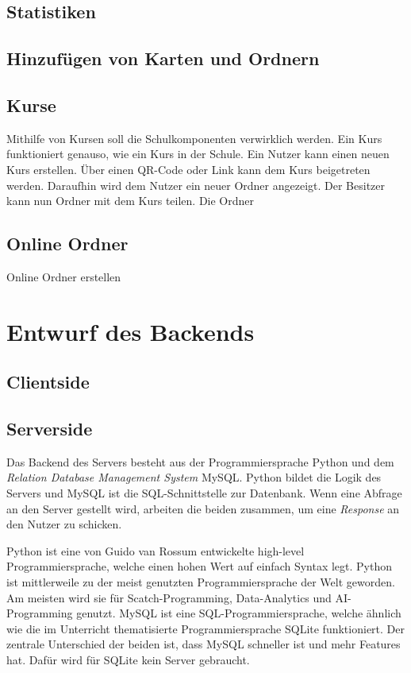 \subsection{Statistiken}
\subsection{Hinzufügen von Karten und Ordnern}
\subsection{Kurse}
Mithilfe von Kursen soll die Schulkomponenten verwirklich werden. Ein Kurs funktioniert genauso, wie ein Kurs in der Schule. Ein Nutzer kann einen neuen Kurs erstellen. Über einen QR-Code oder Link kann dem Kurs beigetreten werden. Daraufhin wird dem Nutzer ein neuer Ordner angezeigt. Der Besitzer kann nun Ordner mit dem Kurs teilen. Die Ordner 
\subsection{Online Ordner}
Online Ordner erstellen 


\section{Entwurf des Backends}

\subsection{Clientside}

\subsection{Serverside}
Das Backend des Servers besteht aus der Programmiersprache Python und dem \textit{Relation Database Management System} MySQL. Python bildet die Logik des Servers und MySQL ist die SQL-Schnittstelle zur Datenbank. Wenn eine Abfrage an den Server gestellt wird, arbeiten die beiden zusammen, um eine \textit{Response} an den Nutzer zu schicken.

Python ist eine von Guido van Rossum entwickelte high-level Programmiersprache, welche einen hohen Wert auf einfach Syntax legt. Python ist mittlerweile zu der meist genutzten Programmiersprache der Welt geworden. Am meisten wird sie für Scatch-Programming, Data-Analytics und AI-Programming genutzt. MySQL ist eine SQL-Programmiersprache, welche ähnlich wie die im Unterricht thematisierte Programmiersprache SQLite funktioniert. Der zentrale Unterschied der beiden ist, dass MySQL schneller ist und mehr Features hat. Dafür wird für SQLite kein Server gebraucht.



